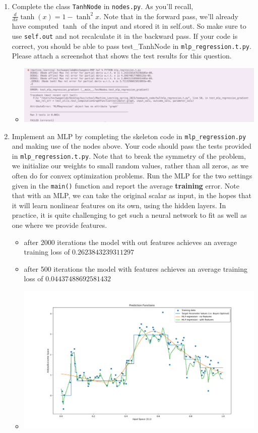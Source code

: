 \documentclass{article}
\theoremstyle{plain}
\theoremstyle{definition}
\begin{document}
\begin{enumerate}
\item Complete the class \texttt{TanhNode} in \texttt{nodes.py}. As you'll
recall, $\frac{d}{dx}\tanh(x)=1-\tanh^{2}x$. Note that in the forward
pass, we'll already have computed $\tanh$ of the input and stored
it in self.out. So make sure to use \texttt{self.out} and not recalculate
it in the backward pass. If your code is correct, you should be able to pass test\_TanhNode in \texttt{mlp\_regression.t.py}. Please attach a screenshot that shows the test results for this question.
\begin{itemize}
    \color{blue}
         \item \includegraphics[width = 15cm]{homework_code/hw7/immages/hw_7_10.png}
\end{itemize}
\item Implement an MLP by completing the skeleton code in \texttt{mlp\_regression.py}
and making use of the nodes above. Your code should pass the tests
provided in \texttt{mlp\_regression.t.py}. Note that to break the symmetry
of the problem, we initialize our weights to small random values,
rather than all zeros, as we often do for convex optimization problems.
Run the MLP for the two settings given in the \texttt{main()} function
and report the average \textbf{training} error. Note that with an
MLP, we can take the original scalar as input, in the hopes that it
will learn nonlinear features on its own, using the hidden layers.
In practice, it is quite challenging to get such a neural network
to fit as well as one where we provide features.

\begin{itemize}
    \color{blue}
    \item after 2000 iterations the model with out features  achieves an average training loss of $\mathbf{0.2623843239311297}$
    \item after 500 iterations the model with features achieves an average training loss of $\mathbf{0.04437488692581432}$ 
    \item \includegraphics[width = 15cm]{homework_code/hw7/immages/hw_7_11.png}
\end{itemize}



\end{enumerate}
\end{document}

